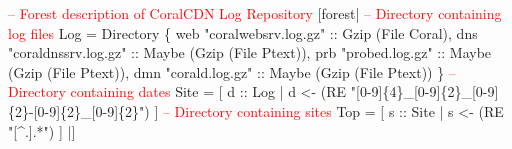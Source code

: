 \begin{code}
\textcolor{red}{-- Forest description of CoralCDN Log Repository}
[forest|
  \textcolor{red}{-- Directory containing log files}
   Log = Directory 
    \{ web  "coralwebsrv.log.gz" :: Gzip (File Coral),          
      dns  "coraldnssrv.log.gz" :: Maybe (Gzip (File Ptext)),
      prb  "probed.log.gz"      :: Maybe (Gzip (File Ptext)),
      dmn  "corald.log.gz"      :: Maybe (Gzip (File Ptext)) \}
\mbox{}
  \textcolor{red}{-- Directory containing dates}
   Site = [ d :: Log | d <-  (RE "[0-9]\{4\}\_[0-9]\{2\}\_[0-9]\{2\}-[0-9]\{2\}\_[0-9]\{2\}") ] 
\mbox{}
  \textcolor{red}{-- Directory containing sites}
   Top = [ s :: Site | s <-  (RE "[^.].*") ] 
|]
\end{code}

